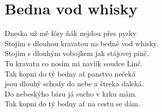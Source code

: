\section{Bedna vod whisky}
\onehalfspacing

Dneska už mě fóry ňák nejdou přes pysky \\
Stojím s dlouhou kravatou na bedně vod whisky. \\
Stojím s dlouhým vobojkem jak stájovej pinč. \\
Tu kravatu co nosím mi navlík soudce Linč. \\

{}Tak kopni do tý bedny ať panstvo nečeká \\
jsou dlouhý schody do nebe a štreka daleká. \\
Do nebeskýho báru já sucho v krku mám. \\
Tak kopni do tý bedny ať na cestu se dám. \\

